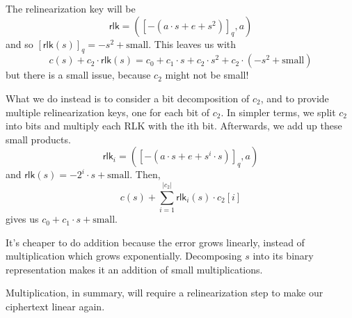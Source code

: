 The relinearization key will be
\[\mathsf{rlk} = \left( [-(a\cdot s + e + s^2)]_q, a \right)\]
and so $[\mathsf{rlk}(s)]_q = -s^2 + \text{small}$. This leaves us with
\[c(s) + c_2 \cdot \mathsf{rlk}(s) = c_0 + c_1\cdot s + c_2\cdot s^2 + c_2\cdot (-s^2 + \text{small})\]
but there is a small issue, because $c_2$ might not be small!

What we do instead is to consider a bit decomposition of $c_2$, and to provide multiple relinearization keys, one for each bit of $c_2$. In simpler terms, we split $c_2$ into bits and multiply each RLK with the ith bit. Afterwards, we add up these small products.
\[\mathsf{rlk}_i = ([-(a\cdot s + e + s^i\cdot s)]_q, a)\]
and $\mathsf{rlk}(s) = -2^i\cdot s + \text{small}$. Then,
\[c(s) + \sum^{|c_2|}_{i=1}\mathsf{rlk}_i(s)\cdot c_2[i]\]
gives us $c_0 + c_1\cdot s + \text{small}$.

It's cheaper to do addition because the error grows linearly, instead of multiplication which grows exponentially. Decomposing $s$ into its binary representation makes it an addition of small multiplications.

Multiplication, in summary, will require a relinearization step to make our ciphertext linear again.
